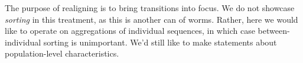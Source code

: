 \documentclass{article}
\begin{document}
The purpose of realigning is to bring transitions into focus. We do not showcase
\emph{sorting} in this treatment, as this is another can of worms. Rather, here
we would like to operate on aggregations of individual sequences, in which case
between-individual sorting is unimportant. We'd still like to make statements
about population-level characteristics.





\FloatBarrier
\singlespacing

   
\end{document}
